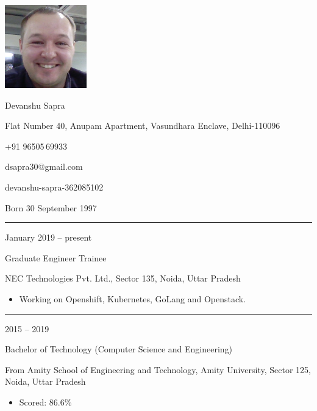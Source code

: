 \documentclass[a4paper,10pt]{article}
\newlength{\cvcolumngapwidth}
\newlength{\cvleftcolumnwidth}
\newlength{\cvrightcolumnwidth}
\newcommand{\cvnamestyle}[1]{{\Large\cvnamefont\textcolor{cvnamecolor}{#1}}}
\newcommand{\cvsectionstyle}[1]{{\normalsize\cvsectionfont\textcolor{cvsectioncolor}{#1}}}
\newcommand{\cvtitlestyle}[1]{{\large\cvtitlefont\textcolor{cvtitlecolor}{#1}}}
\newcommand{\cvdurationstyle}[1]{{\small\cvdurationfont\textcolor{cvdurationcolor}{#1}}}
\newlength{\cvafteritemskipamount}
\newlength{\cvaftersectionskipamount}
\newlength{\cvafternameskipamount}
\newlength{\cvafterpersonalinfolineskipamount}
\newlength{\cvaftertitleskipamount}
\newlength{\cvparskip}
\newcommand{\cvpersonalinfo}[2]{
    \begin{minipage}[t]{\cvleftcolumnwidth}
        \vspace{0mm} %
        \raggedleft #1
    \end{minipage}%
    \hspace{\cvcolumngapwidth}%
    \begin{minipage}[t]{\cvrightcolumnwidth}
        \vspace{0mm} %
        #2
    \end{minipage}

    \vspace{\cvafteritemskipamount}
}
\newcommand{\cvname}[1]{
    \cvnamestyle{#1}

    \vspace{\cvafternameskipamount}
}
\newcommand{\cvpersonalinfolinewithicon}[3]{
    \raisebox{.5\fontcharht\font`E-.5\height}{\texttt{[image: \#2]}}
    #3

    \vspace{\cvafterpersonalinfolineskipamount}
}
\newcommand{\cvsection}[1]{
    \begin{minipage}[t]{\cvleftcolumnwidth}
        \raggedleft\cvsectionstyle{#1}
    \end{minipage}%
    \hspace{\cvcolumngapwidth}%
    \begin{minipage}[t]{\cvrightcolumnwidth}
        \textcolor{cvrulecolor}{\rule{\cvrightcolumnwidth}{0.3mm}}
    \end{minipage}

    \vspace{\cvaftersectionskipamount}
}
\newcommand{\cvitem}[2]{
    \begin{minipage}[t]{\cvleftcolumnwidth}
        \raggedleft #1
    \end{minipage}%
    \hspace{\cvcolumngapwidth}%
    \begin{minipage}[t]{\cvrightcolumnwidth}
        \setlength{\parskip}{\cvparskip} #2
    \end{minipage}

    \vspace{\cvafteritemskipamount}
}
\newcommand{\cvtitle}[1]{
    \cvtitlestyle{#1}

    \vspace{\cvaftertitleskipamount}
    \vspace{-\cvparskip}
}
\begin{document}

\cvpersonalinfo{
    \includegraphics[height=36mm]{photo.png}
}{
    \cvname{Devanshu Sapra}

    \cvpersonalinfolinewithicon{height=4mm}{072-location.pdf}{
        Flat Number 40, Anupam Apartment, Vasundhara Enclave, Delhi-110096
    }

    \cvpersonalinfolinewithicon{height=4mm}{067-phone.pdf}{
        +91 96505\,69933\
    }

    \cvpersonalinfolinewithicon{height=4mm}{070-envelop.pdf}{
        dsapra30@gmail.com
    }

    \cvpersonalinfolinewithicon{height=4mm}{458-linkedin.pdf}{
        devanshu-sapra-362085102
    }

    Born 30 September 1997
}



\cvsection{WORK EXPERIENCE}

\cvitem{
    \cvdurationstyle{January 2019 -- present}
}{
    \cvtitle{Graduate Engineer Trainee}

    NEC Technologies Pvt. Ltd., Sector 135, Noida, Uttar Pradesh

    \begin{itemize}[leftmargin=*]
        \item Working on Openshift, Kubernetes, GoLang and Openstack.
    \end{itemize}
}



\cvsection{EDUCATION}

\cvitem{
    \cvdurationstyle{2015 -- 2019}
}{
    \cvtitle{Bachelor of Technology (Computer Science and Engineering)}

    From Amity School of Engineering and Technology, Amity University, Sector 125, Noida, Uttar Pradesh

    \begin{itemize}[leftmargin=*]
        \item Scored: 86.6\%
    \end{itemize}
}
\end{document}
